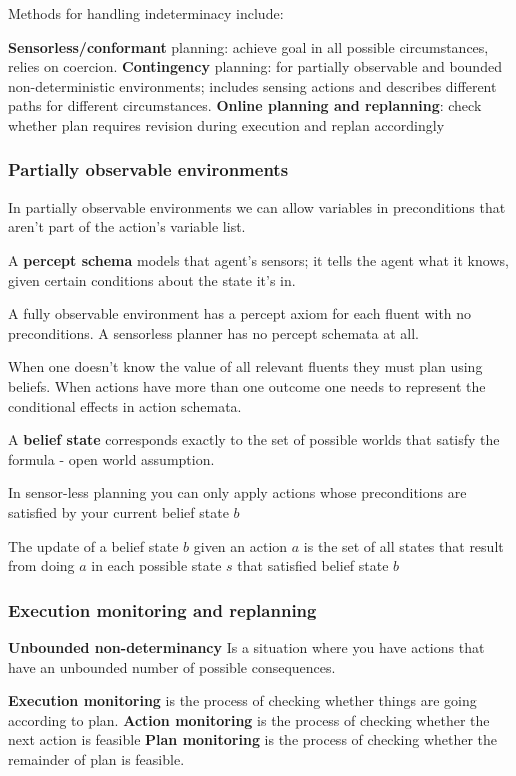 \documentclass{article}
\begin{document}
Methods for handling indeterminacy include:

\textbf{Sensorless/conformant} planning: achieve goal in all possible circumstances, relies on coercion. \textbf{Contingency} planning: for partially observable and bounded non-deterministic environments; includes sensing actions and describes different paths for different circumstances. \textbf{Online planning and replanning}: check whether plan requires revision during execution and replan accordingly

\subsubsection{Partially observable environments}

In partially observable environments we can allow variables in preconditions that aren't part of the action's variable list.

A \textbf{percept schema} models that agent's sensors; it tells the agent what it knows, given certain conditions about the state it's in. 

A fully observable environment has a percept axiom for each fluent with no preconditions. A sensorless planner has no percept schemata at all.

When one doesn't know the value of all relevant fluents they must plan using beliefs. When actions have more than one outcome one needs to represent the conditional effects in action schemata.

A \textbf{belief state} corresponds exactly to the set of possible worlds that satisfy the formula - open world assumption. 

In sensor-less planning you can only apply actions whose preconditions are satisfied by your current belief state $b$

The update of a belief state $b$ given an action $a$ is the set of all states that result from doing $a$ in each possible state $s$ that satisfied belief state $b$


 \subsubsection{Execution monitoring and replanning}

\textbf{Unbounded non-determinancy} Is a situation where you have actions that have an unbounded number of possible consequences. 

 \textbf{Execution monitoring} is the process of checking whether things are going according to plan. 
 \textbf{Action monitoring} is the process of checking whether the next action is feasible 
 \textbf{Plan monitoring} is the process of checking whether the remainder of plan is feasible. 
\end{document}
